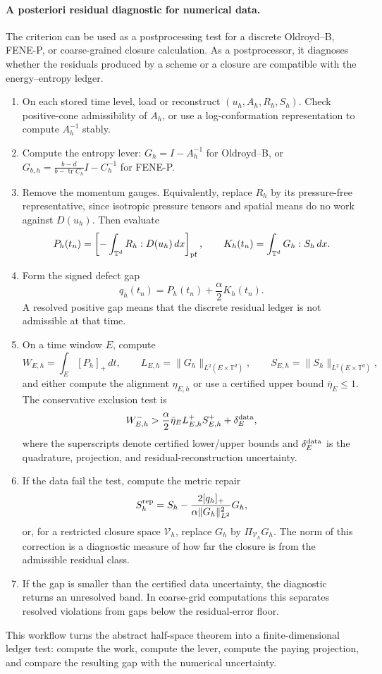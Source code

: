 \documentclass[11pt]{article}
\numberwithin{equation}{section}
\newcommand{\T}{\mathbb T}
\begin{document}
\paragraph{A posteriori residual diagnostic for numerical data.}
The criterion can be used as a postprocessing test for a discrete Oldroyd--B,
FENE-P, or coarse-grained closure calculation.  As a postprocessor, it diagnoses
whether the residuals produced by a scheme or a closure are compatible with the
energy--entropy ledger.
\begin{enumerate}[label=\textbf{D\arabic*.},leftmargin=*]
\item On each stored time level, load or reconstruct
\((u_h,A_h,R_h,S_h)\).  Check positive-cone admissibility of \(A_h\), or use a
log-conformation representation to compute \(A_h^{-1}\) stably.
\item Compute the entropy lever: \(G_h=I-A_h^{-1}\) for Oldroyd--B, or
\(G_{b,h}=\frac{b-d}{b-\operatorname{tr}C_h}I-C_h^{-1}\) for FENE-P.
\item Remove the momentum gauges.  Equivalently, replace \(R_h\) by its
pressure-free representative, since isotropic pressure tensors and spatial
means do no work against \(D(u_h)\).  Then evaluate
\[
  P_h(t_n)=\left[-\int_{\T^d}R_h:D(u_h)\,dx\right]_{\rm pf},
  \qquad
  K_h(t_n)=\int_{\T^d}G_h:S_h\,dx .
\]
\item Form the signed defect gap
\[
  q_h(t_n)=P_h(t_n)+\frac{\alpha}{2}K_h(t_n).
\]
A resolved positive gap means that the discrete residual ledger is not
admissible at that time.
\item On a time window \(E\), compute
\[
  W_{E,h}=\int_E[P_h]_+\,dt,
  \qquad
  L_{E,h}=\|G_h\|_{L^2(E\times\T^d)},
  \qquad
  S_{E,h}=\|S_h\|_{L^2(E\times\T^d)},
\]
and either compute the alignment \(\eta_{E,h}\) or use a certified upper bound
\(\bar\eta_E\le1\).  The conservative exclusion test is
\[
  W_{E,h}^- > \frac{\alpha}{2}\bar\eta_E L_{E,h}^+S_{E,h}^+ +
  \delta_E^{\rm data},
\]
where the superscripts denote certified lower/upper bounds and
\(\delta_E^{\rm data}\) is the quadrature, projection, and residual-reconstruction
uncertainty.
\item If the data fail the test, compute the metric repair
\[
  S_h^{\rm rep}=S_h-
  \frac{2[q_h]_+}{\alpha\|G_h\|_{L^2}^2}G_h,
\]
or, for a restricted closure space \(\mathcal V_h\), replace \(G_h\) by
\(\Pi_{\mathcal V_h}G_h\).  The norm of this correction is a diagnostic measure
of how far the closure is from the admissible residual class.
\item If the gap is smaller than the certified data uncertainty, the diagnostic
returns an unresolved band.  In coarse-grid computations this separates
resolved violations from gaps below the residual-error floor.
\end{enumerate}
This workflow turns the abstract half-space theorem into a finite-dimensional
ledger test: compute the work, compute the lever, compute the paying projection,
and compare the resulting gap with the numerical uncertainty.
\end{document}
